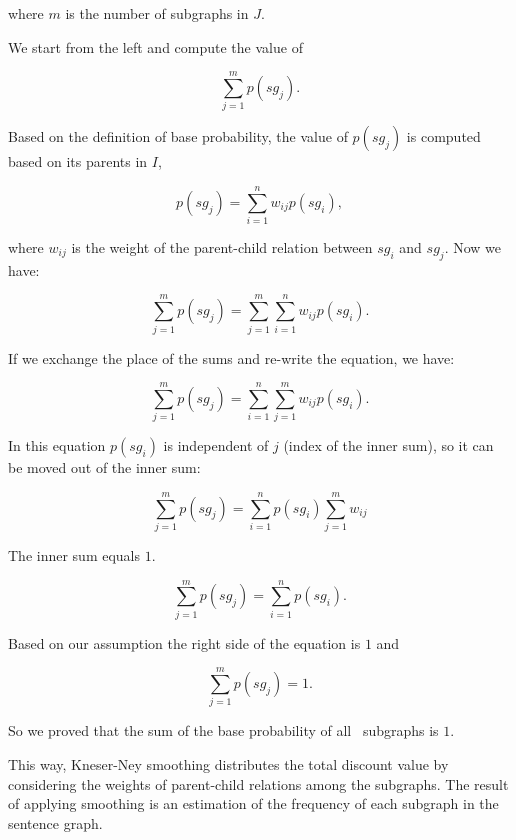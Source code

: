 \noindent
where $m$ is the number of subgraphs in $J$.

We start from the left and compute the value of 

\begin{equation*}
\sum_{j=1}^m p(sg_j).
\end{equation*}

\noindent
Based on the definition of base probability, the value of
$p(sg_j)$ is computed based on its parents in $I$,

\begin{equation*}
p(sg_j)=\sum_{i=1}^n w_{ij}p(sg_i),
\end{equation*}

\noindent
where $w_{ij}$ is the weight of the parent-child relation between
$sg_i$ and $sg_j$.  Now we have:

\begin{equation*}\sum_{j=1}^m p(sg_j) = \sum_{j=1}^m\sum_{i=1}^n w_{ij}p(sg_i).
\end{equation*}

\noindent
If we exchange the place of the sums and re-write the equation, we
have: 

\begin{equation*}
\sum_{j=1}^m p(sg_j) = \sum_{i=1}^n \sum_{j=1}^m w_{ij}p(sg_i).
\end{equation*}

\noindent
In this equation $p(sg_i)$ is independent of $j$ (index of the inner
sum), so it can be moved out of the inner sum:

\begin{equation*}
\sum_{j=1}^m p(sg_j) = \sum_{i=1}^n p(sg_i) \sum_{j=1}^m w_{ij}
\end{equation*}

\noindent
The inner sum equals $1$.

\begin{equation*}
\sum_{j=1}^m p(sg_j) = \sum_{i=1}^n p(sg_i).
\end{equation*}

\noindent
Based on our assumption the right side of the equation is $1$ and 

\begin{equation*}
\sum_{j=1}^m p(sg_j) = 1.
\end{equation*}

\noindent
So we proved that the sum of the base probability of all \knode\
subgraphs is $1$.\QEDB


This way, Kneser-Ney smoothing distributes the total discount value by
considering the weights of parent-child relations among the
subgraphs. The result of applying smoothing is an estimation of the
frequency of each subgraph in the sentence graph.


